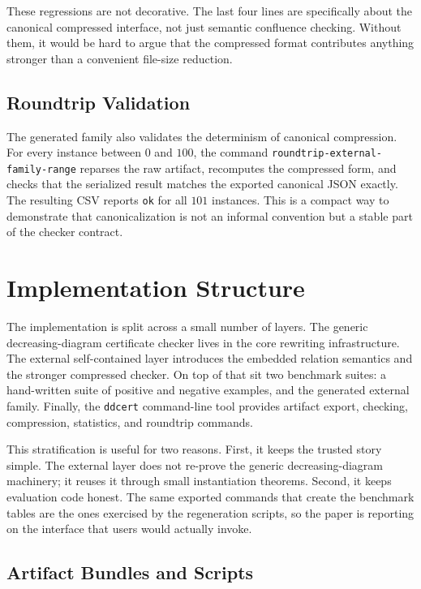 \documentclass[submission,copyright,creativecommons]{eptcs}
\newcommand{\ddcert}{\texttt{ddcert}\xspace}
\begin{document}
These regressions are not decorative. The last four lines are specifically about
the canonical compressed interface, not just semantic confluence checking.
Without them, it would be hard to argue that the compressed format contributes
anything stronger than a convenient file-size reduction.

\subsection{Roundtrip Validation}

The generated family also validates the determinism of canonical compression.
For every instance between $0$ and $100$, the command
\texttt{roundtrip-external-family-range} reparses the raw artifact, recomputes
the compressed form, and checks that the serialized result matches the exported
canonical JSON exactly. The resulting CSV reports \texttt{ok} for all $101$
instances. This is a compact way to demonstrate that canonicalization is not an
informal convention but a stable part of the checker contract.

\section{Implementation Structure}

The implementation is split across a small number of layers. The generic
decreasing-diagram certificate checker lives in the core rewriting
infrastructure. The external self-contained layer introduces the embedded
relation semantics and the stronger compressed checker. On top of that sit two
benchmark suites: a hand-written suite of positive and negative examples, and
the generated external family. Finally, the \ddcert command-line tool provides
artifact export, checking, compression, statistics, and roundtrip commands.

This stratification is useful for two reasons. First, it keeps the trusted story
simple. The external layer does not re-prove the generic decreasing-diagram
machinery; it reuses it through small instantiation theorems. Second, it keeps
evaluation code honest. The same exported commands that create the benchmark
tables are the ones exercised by the regeneration scripts, so the paper is
reporting on the interface that users would actually invoke.

\subsection{Artifact Bundles and Scripts}
\end{document}
